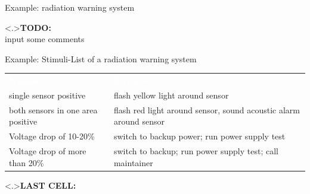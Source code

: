 \documentclass[ngerman={babel}, utf8, bigger, xcolor={table,dvipsnames}, ompress, hyperref={bookmarks,colorlinks}]{beamer}
\begin{document}
\begin{frame}{Example: radiation warning system}
	
	{\textbf{TODO:}\\ input some comments}
\end{frame}

\begin{frame}{Example: Stimuli-List of a radiation warning system}
	\begin{tabular}{p{9em}p{13em}}
		\rowcolor{blue}\hline \textcolor{white}{Stimulus} & \textcolor{white}{Response} \pause \\
		single sensor positive & flash yellow light around sensor \pause \\
		both sensors in one area positive & flash red light around sensor, sound acoustic alarm around sensor \pause \\
		Voltage drop of 10-20\% & switch to backup power; run power supply test \pause \\
		Voltage drop of more than 20\% & switch to backup; run power supply test; call maintainer \\
	\end{tabular}
	{\textbf{LAST CELL:}\\}
\end{frame}
\end{document}
